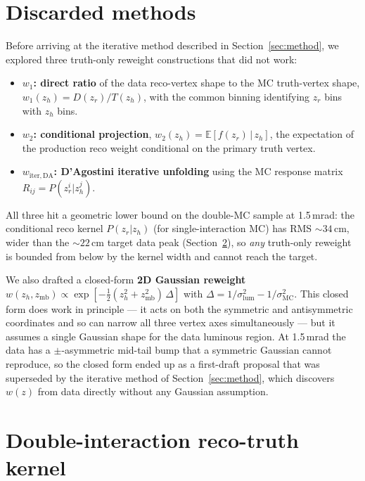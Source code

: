 \documentclass[11pt,a4paper]{article}
\begin{document}
\section{Discarded methods}
\label{app:discarded}

Before arriving at the iterative method described in
Section~\ref{sec:method}, we explored three truth-only reweight
constructions that did not work:
\begin{itemize}\setlength\itemsep{1pt}
\item \textbf{$w_1$: direct ratio} of the data reco-vertex shape to the
MC truth-vertex shape, $w_1(z_h) = D(z_r)/T(z_h)$, with the common
binning identifying $z_r$ bins with $z_h$ bins.
\item \textbf{$w_2$: conditional projection},
$w_2(z_h) = \mathbb{E}[f(z_r)\,|\,z_h]$, the expectation of the
production reco weight conditional on the primary truth vertex.
\item \textbf{$w_\mathrm{iter,DA}$: D'Agostini iterative unfolding}
using the MC response matrix $R_{ij}=P(z_r^i|z_h^j)$.
\end{itemize}
All three hit a geometric lower bound on the double-MC sample at
1.5\,mrad: the conditional reco kernel $P(z_r|z_h)$ (for single-interaction MC) has
RMS $\sim\!34$\,cm, wider than the $\sim\!22$\,cm target data peak
(Section~\ref{app:double_diag}), so \emph{any} truth-only reweight is
bounded from below by the kernel width and cannot reach the target.

We also drafted a closed-form \textbf{2D Gaussian reweight}
$w(z_h,z_\mathrm{mb}) \propto \exp[-\tfrac{1}{2}(z_h^2 + z_\mathrm{mb}^2)\,\Delta]$
with $\Delta = 1/\sigma_\mathrm{lum}^2 - 1/\sigma_\mathrm{MC}^2$. This
closed form does work in principle --- it acts on both the symmetric
and antisymmetric coordinates and so can narrow all three vertex axes
simultaneously --- but it assumes a single Gaussian shape for the data
luminous region. At 1.5\,mrad the data has a $\pm$-asymmetric mid-tail
bump that a symmetric Gaussian cannot reproduce, so the closed form
ended up as a first-draft proposal that was superseded by the
iterative method of Section~\ref{sec:method}, which discovers $w(z)$
from data directly without any Gaussian assumption.

\section{Double-interaction reco-truth kernel}
\label{app:double_diag}
\end{document}
